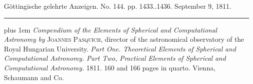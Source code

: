 \begin{center}\small Göttingische gelehrte Anzeigen. No. 144. pp. 1433..1436. September 9, 1811.\\[3pt]\rule{.72\linewidth}{.3pt}\end{center}

{\rightskip=0pt plus 1em \emph{Compendium of the Elements of Spherical and Computational Astronomy by} \textsc{Joannes Pasquich}, director of the astronomical observatory of the Royal Hungarian University. \emph{Part One. {Theoretical} Elements of Spherical and Computational Astronomy. Part Two, {Practical} Elements of Spherical and Computational Astronomy.} 1811. 160 and 166 pages in quarto. Vienna, Schaumann and Co.\par}

